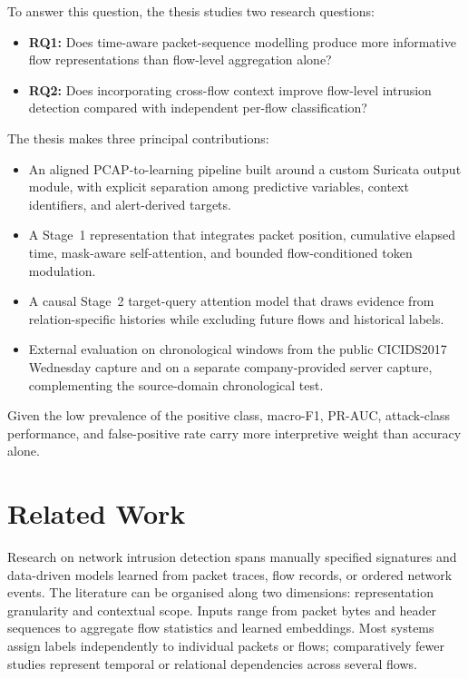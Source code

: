\documentclass[11pt,fleqn]{report}
\begin{document}
To answer this question, the thesis studies two research questions:

\begin{itemize}
    \item \textbf{RQ1:} Does time-aware packet-sequence modelling produce more informative flow representations than flow-level aggregation alone?
    \item \textbf{RQ2:} Does incorporating cross-flow context improve flow-level intrusion detection compared with independent per-flow classification?
\end{itemize}

The thesis makes three principal contributions:

\begin{itemize}
    \item An aligned PCAP-to-learning pipeline built around a custom Suricata output module, with explicit separation among predictive variables, context identifiers, and alert-derived targets.
    \item A Stage~1 representation that integrates packet position, cumulative elapsed time, mask-aware self-attention, and bounded flow-conditioned token modulation.
    \item A causal Stage~2 target-query attention model that draws evidence from relation-specific histories while excluding future flows and historical labels.
    \item External evaluation on chronological windows from the public CICIDS2017 Wednesday capture and on a separate company-provided server capture, complementing the source-domain chronological test.
\end{itemize}

Given the low prevalence of the positive class, macro-F1, PR-AUC, attack-class performance, and false-positive rate carry more interpretive weight than accuracy alone.

\chapter{Related Work}
\label{sec:related_work}

Research on network intrusion detection spans manually specified signatures and data-driven models learned from packet traces, flow records, or ordered network events. The literature can be organised along two dimensions: representation granularity and contextual scope. Inputs range from packet bytes and header sequences to aggregate flow statistics and learned embeddings. Most systems assign labels independently to individual packets or flows; comparatively fewer studies represent temporal or relational dependencies across several flows.
\end{document}
